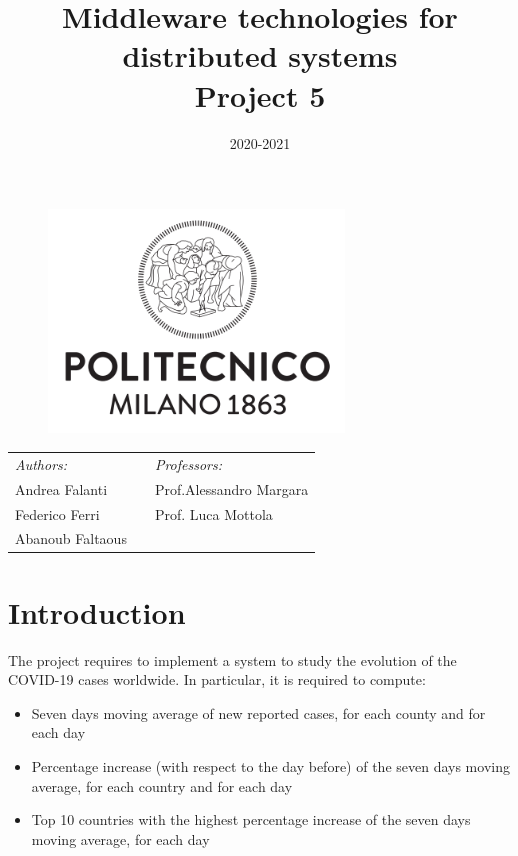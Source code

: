 \documentclass[10pt]{article}
\title{Middleware technologies for distributed systems\\Project 5}
\date{2020-2021}
\begin{document}
	\begin{titlepage}
		\begin{figure}[t]
			\centering\includegraphics[width=0.7\textwidth]{../../docResources/logo_polimi}
		\end{figure}
		\maketitle
		
		\large
		\begin{tabularx}{\linewidth}{@{}lXl@{}}
			\textit{Authors:}  & & \textit{Professors:} \\
			Andrea Falanti      & & Prof.\@ Alessandro Margara\\
			Federico Ferri  & & Prof. Luca Mottola \\
			Abanoub Faltaous & & \\
		\end{tabularx}		
		\thispagestyle{empty}
	\end{titlepage}
	
	\tableofcontents
	\newpage
	
	\section{Introduction}
	The project requires to implement a system to study the evolution of the COVID-19 cases worldwide. In particular, it is required to compute:
	\begin{itemize}
		\item Seven days moving average of new reported cases, for each county and for each day
		\item Percentage increase (with respect to the day before) of the seven days moving average, for each country and for each day
		\item Top 10 countries with the highest percentage increase of the seven days moving average, for each day
	\end{itemize}
\end{document}
